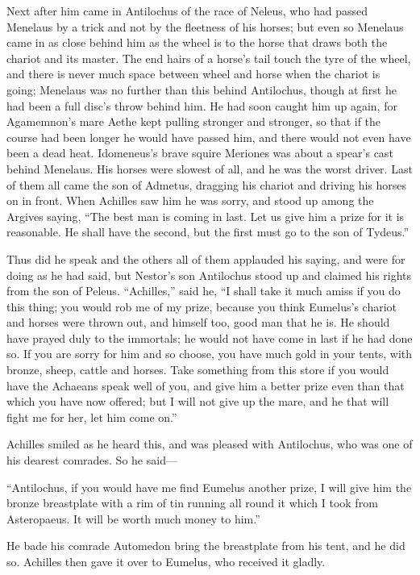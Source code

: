 Next after him came in Antilochus of the race of Neleus, who had passed
Menelaus by a trick and not by the fleetness of his horses; but even so
Menelaus came in as close behind him as the wheel is to the horse that
draws both the chariot and its master. The end hairs of a horse’s tail
touch the tyre of the wheel, and there is never much space between wheel
and horse when the chariot is going; Menelaus was no further than this
behind Antilochus, though at first he had been a full disc’s throw behind
him. He had soon caught him up again, for Agamemnon’s mare Aethe kept
pulling stronger and stronger, so that if the course had been longer he
would have passed him, and there would not even have been a dead heat.
Idomeneus’s brave squire Meriones was about a spear’s cast behind
Menelaus. His horses were slowest of all, and he was the worst driver.
Last of them all came the son of Admetus, dragging his chariot and driving
his horses on in front. When Achilles saw him he was sorry, and stood up
among the Argives saying, “The best man is coming in last. Let us give him
a prize for it is reasonable. He shall have the second, but the first must
go to the son of Tydeus.”

Thus did he speak and the others all of them applauded his saying, and
were for doing as he had said, but Nestor’s son Antilochus stood up and
claimed his rights from the son of Peleus. “Achilles,” said he, “I shall
take it much amiss if you do this thing; you would rob me of my prize,
because you think Eumelus’s chariot and horses were thrown out, and
himself too, good man that he is. He should have prayed duly to the
immortals; he would not have come in last if he had done so. If you are
sorry for him and so choose, you have much gold in your tents, with
bronze, sheep, cattle and horses. Take something from this store if you
would have the Achaeans speak well of you, and give him a better prize
even than that which you have now offered; but I will not give up the
mare, and he that will fight me for her, let him come on.”

Achilles smiled as he heard this, and was pleased with Antilochus, who was
one of his dearest comrades. So he said—

“Antilochus, if you would have me find Eumelus another prize, I will give
him the bronze breastplate with a rim of tin running all round it which I
took from Asteropaeus. It will be worth much money to him.”

He bade his comrade Automedon bring the breastplate from his tent, and he
did so. Achilles then gave it over to Eumelus, who received it gladly.

